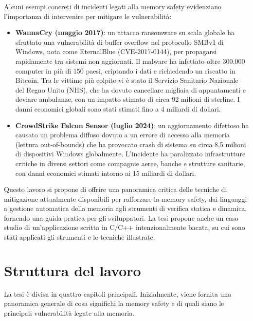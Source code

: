 Alcuni esempi concreti di incidenti legati alla memory safety evidenziano l'importanza
di intervenire per mitigare le vulnerabilità:

\begin{itemize}
  \item \textbf{WannaCry (maggio 2017)}: un attacco ransomware su scala globale ha
    sfruttato una vulnerabilità di buffer overflow nel protocollo SMBv1 di Windows,
    nota come EternalBlue (CVE-2017-0144), per propagarsi rapidamente tra sistemi
    non aggiornati. Il malware ha infettato oltre 300.000 computer in più di 150
    paesi, criptando i dati e richiedendo un riscatto in Bitcoin. Tra le vittime
    più colpite vi è stato il Servizio Sanitario Nazionale del Regno Unito (NHS),
    che ha dovuto cancellare migliaia di appuntamenti e deviare ambulanze, con
    un impatto stimato di circa 92 milioni di sterline. I danni economici globali
    sono stati stimati fino a 4 miliardi di dollari.\cite{wannacry_kaspersky}

  \item \textbf{CrowdStrike Falcon Sensor (luglio 2024)}: un aggiornamento difettoso
    ha causato un problema diffuso dovuto a un errore di accesso alla memoria (lettura
    out-of-bounds) che ha provocato crash di sistema su circa 8,5 milioni di dispositivi
    Windows globalmente. L'incidente ha paralizzato infrastrutture critiche in
    diversi settori come compagnie aeree, banche e strutture sanitarie, con
    danni economici stimati intorno ai 15 miliardi di dollari.\cite{crowdstrike_bug_wired}\cite{crowdstrike_bug_wired_cost}
\end{itemize}

\noindent
Questo lavoro si propone di offrire una panoramica critica delle tecniche di
mitigazione attualmente disponibili per rafforzare la memory safety, dai linguaggi
a gestione automatica della memoria agli strumenti di verifica statica e dinamica,
fornendo una guida pratica per gli sviluppatori. La tesi propone anche un caso studio
di un'applicazione scritta in C/C++ intenzionalmente bacata, su cui sono stati
applicati gli strumenti e le tecniche illustrate.

\section{Struttura del lavoro}
La tesi è divisa in quattro capitoli principali. Inizialmente, viene fornita una
panoramica generale di cosa significhi la memory safety e di quali siano le
principali vulnerabilità legate alla memoria.

